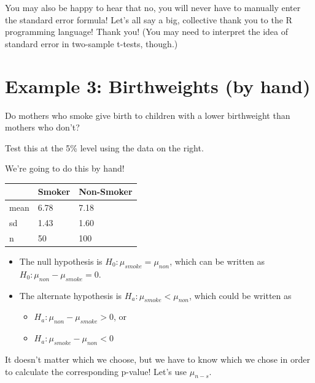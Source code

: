 \documentclass[
  letterpaper,
  DIV=11,
  numbers=noendperiod,
  oneside]{scrreprt}
\providecommand{\tightlist}{%
  \setlength{\itemsep}{0pt}\setlength{\parskip}{0pt}}\usepackage{longtable,booktabs,array}
\begin{document}
You may also be happy to hear that no, you will never have to manually
enter the standard error formula! Let's all say a big, collective thank
you to the R programming language! Thank you! (You may need to interpret
the idea of standard error in two-sample t-tests, though.)

\hypertarget{example-3-birthweights-by-hand}{%
\section{Example 3: Birthweights (by
hand)}\label{example-3-birthweights-by-hand}}

Do mothers who smoke give birth to children with a lower birthweight
than mothers who don't?

\pspace

Test this at the 5\% level using the data on the right.

We're going to do this by hand!

\vspace{-7mm}

\begin{longtable}[]{@{}lll@{}}
\toprule\noalign{}
& Smoker & Non-Smoker \\
\midrule\noalign{}
\endhead
\bottomrule\noalign{}
\endlastfoot
mean & 6.78 & 7.18 \\
sd & 1.43 & 1.60 \\
n & 50 & 100 \\
\end{longtable}

\begin{itemize}
\tightlist
\item
  The null hypothesis is \(H_0: \mu_{smoke} = \mu_{non}\), which can be
  written as \(H_0: \mu_{non} - \mu_{smoke} = 0\).\pause\lspace
\item
  The alternate hypothesis is \(H_a: \mu_{smoke} < \mu_{non}\), which
  could be written as

  \begin{itemize}
  \tightlist
  \item
    \(H_a: \mu_{non} - \mu_{smoke} > 0\), or
  \item
    \(H_a: \mu_{smoke} - \mu_{non} < 0\)
  \end{itemize}
\end{itemize}

It doesn't matter which we choose, but we have to know which we chose in
order to calculate the corresponding p-value! Let's use \(\mu_{n-s}\).
\end{document}
